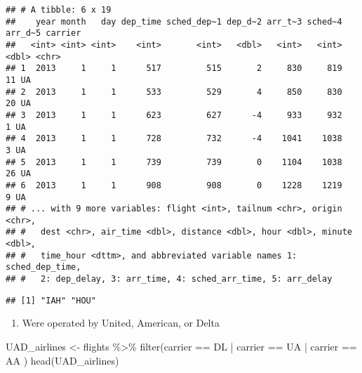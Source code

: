 \documentclass[
]{article}
\newenvironment{Shaded}{\begin{snugshade}}{\end{snugshade}}
\newcommand{\FunctionTok}[1]{\textcolor[rgb]{0.00,0.00,0.00}{#1}}
\newcommand{\NormalTok}[1]{#1}
\newcommand{\OtherTok}[1]{\textcolor[rgb]{0.56,0.35,0.01}{#1}}
\newcommand{\SpecialCharTok}[1]{\textcolor[rgb]{0.00,0.00,0.00}{#1}}
\newcommand{\StringTok}[1]{\textcolor[rgb]{0.31,0.60,0.02}{#1}}
\providecommand{\tightlist}{%
  \setlength{\itemsep}{0pt}\setlength{\parskip}{0pt}}
\begin{document}
\begin{verbatim}
## # A tibble: 6 x 19
##    year month   day dep_time sched_dep~1 dep_d~2 arr_t~3 sched~4 arr_d~5 carrier
##   <int> <int> <int>    <int>       <int>   <dbl>   <int>   <int>   <dbl> <chr>  
## 1  2013     1     1      517         515       2     830     819      11 UA     
## 2  2013     1     1      533         529       4     850     830      20 UA     
## 3  2013     1     1      623         627      -4     933     932       1 UA     
## 4  2013     1     1      728         732      -4    1041    1038       3 UA     
## 5  2013     1     1      739         739       0    1104    1038      26 UA     
## 6  2013     1     1      908         908       0    1228    1219       9 UA     
## # ... with 9 more variables: flight <int>, tailnum <chr>, origin <chr>,
## #   dest <chr>, air_time <dbl>, distance <dbl>, hour <dbl>, minute <dbl>,
## #   time_hour <dttm>, and abbreviated variable names 1: sched_dep_time,
## #   2: dep_delay, 3: arr_time, 4: sched_arr_time, 5: arr_delay
\end{verbatim}

\begin{Shaded}
\end{Shaded}

\begin{verbatim}
## [1] "IAH" "HOU"
\end{verbatim}

\begin{enumerate}
\def\labelenumi{\alph{enumi})}
\setcounter{enumi}{2}
\tightlist
\item
  Were operated by United, American, or Delta
\end{enumerate}

\begin{Shaded}
\begin{Highlighting}[]
\NormalTok{UAD\_airlines }\OtherTok{\textless{}{-}}\NormalTok{ flights }\SpecialCharTok{\%\textgreater{}\%} \FunctionTok{filter}\NormalTok{(carrier }\SpecialCharTok{==} \StringTok{\textquotesingle{}DL\textquotesingle{}} \SpecialCharTok{|}\NormalTok{ carrier }\SpecialCharTok{==} \StringTok{\textquotesingle{}UA\textquotesingle{}} \SpecialCharTok{|}\NormalTok{ carrier }\SpecialCharTok{==} \StringTok{\textquotesingle{}AA\textquotesingle{}}\NormalTok{ )}
\FunctionTok{head}\NormalTok{(UAD\_airlines)}
\end{Highlighting}
\end{Shaded}
\end{document}

